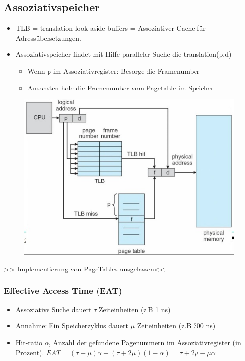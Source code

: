 \documentclass[a4paper]{scrreprt}
\begin{document}
\subsection{Assoziativspeicher}
\begin{itemize}
\item TLB = translation look-aside buffers = Assoziativer Cache für Adressübersetzungen.
\item Assoziativspeicher findet mit Hilfe paralleler Suche die translation(p,d)
\begin{itemize}
\item Wenn p im Assoziativregister: Besorge die Framenumber
\item Ansonsten hole die Framenumber vom Pagetable im Speicher
\end{itemize}
\end{itemize}
\begin{figure}[ht]
\centering
\includegraphics[scale=0.40]{graphics/tlb.png}
\end{figure}


>> Implementierung von PageTables ausgelassen<<
\subsubsection{Effective Access Time (EAT)}
\begin{itemize}
\item Assoziative Suche dauert $\tau$ Zeiteinheiten (z.B 1 ns)
\item Annahme: Ein Speicherzyklus dauert $\mu$ Zeiteinheiten (z.B 300 ns)
\item Hit-ratio $\alpha$, Anzahl der gefundene Pagenummern im Assoziativregister (in Prozent). 
$EAT = (\tau + \mu)  \alpha + (\tau + 2\mu) (1-\alpha) = \tau +2\mu - \mu\alpha$
\end{itemize}
\end{document}
